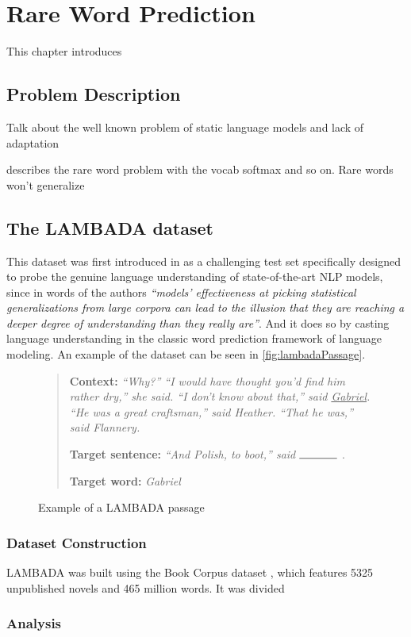 \chapter{Rare Word Prediction}

This chapter introduces


\section{Problem Description}
\label{sec:problemRare}

Talk about the well known problem of static language models and lack of adaptation

\cite{gulcehre2016pointing} describes the rare word problem with the vocab softmax and so on. Rare words won't generalize

\section{The LAMBADA dataset}
\label{sec:lambada}

This dataset was first introduced in \cite{paperno2016lambada} as a challenging test set specifically designed to probe the genuine language understanding of state-of-the-art NLP models, since in words of the authors \textit{``models' effectiveness at picking statistical generalizations from large corpora can lead to the illusion that they are reaching a deeper degree of understanding than they really are''}. And it does so by casting language understanding in
the classic word prediction framework of language modeling. An example of the dataset can be seen in \autoref{fig:lambadaPassage}.

\begin{figure}[H]
	\begin{quote} 		
		 \textbf{Context:} \textit{``Why?'' ``I would have thought you'd find him rather dry,'' she said. ``I don’t know about that,'' said \underline{Gabriel}. ``He was a great craftsman,'' said Heather. ``That he was,'' said Flannery.} \par
		\textbf{Target sentence:} \textit{``And Polish, to boot,'' said $\rule{1.2cm}{0.15mm}$} . \par
		\textbf{Target word:} \textit{Gabriel}
	\end{quote}
	\caption{Example of a LAMBADA passage} \label{fig:lambadaPassage}
\end{figure}

\subsection{Dataset Construction}

LAMBADA was built using the Book Corpus dataset \cite{zhu2015aligning}, which features 5325 unpublished novels and 465 million words. It was divided

\subsection{Analysis}

